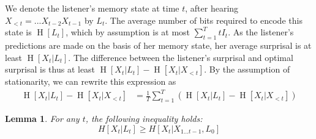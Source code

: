 \documentclass[11pt,letterpaper]{article}
\newcounter{theorem}
\newtheorem{lemma}[theorem]{Lemma}
\begin{document}
	We denote the listener's memory state at time $t$, after hearing $X_{<t} = ... X_{t-2} X_{t-1}$ by $L_t$.
	The average number of bits required to encode this state is $\operatorname{H}[L_t]$, which by assumption is at most $\sum_{t=1}^T t I_t$.
	As the listener's predictions are made on the basis of her memory state, her average surprisal is at least $\operatorname{H}[X_t | L_t]$.
	The difference between the listener's surprisal and optimal surprisal is thus at least $\operatorname{H}[X_t | L_t] - \operatorname{H}[X_t | X_{<t}]$.
By the assumption of stationarity, we can rewrite this expression as
\begin{align*}
	\operatorname{H}[X_t | L_t] - \operatorname{H}[X_t | X_{<t}] &=  \frac{1}{T} \sum_{t=1}^{T} \left(\operatorname{H}[X_t | L_t] - \operatorname{H}[X_t | X_{<t}]\right) 
\end{align*}
	\begin{lemma}
For any $t$, the following inequality holds:
	\begin{equation}
H[X_t | L_t] \geq H[X_t|X_{1 \dots t-1}, L_0]
		\end{equation}
	\end{lemma}
\end{document}
